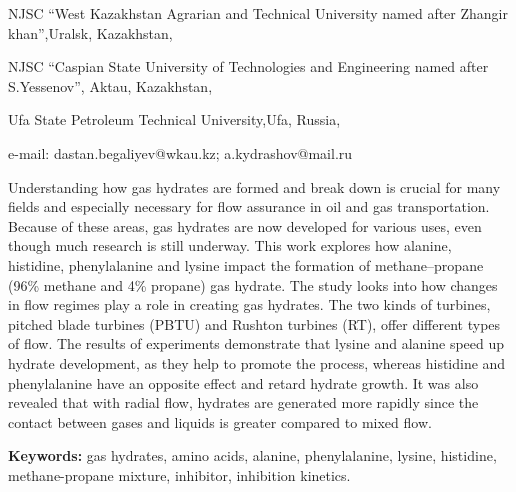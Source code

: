 \begin{affil}
NJSC ``West Kazakhstan Agrarian and Technical University named after Zhangir khan'',Uralsk, Kazakhstan,

NJSC ``Caspian State University of Technologies and Engineering named after S.Yessenov'', Aktau, Kazakhstan,

Ufa State Petroleum Technical University,Ufa, Russia,

e-mail: dastan.begaliyev@wkau.kz; a.kydrashov@mail.ru
\end{affil}

Understanding how gas hydrates are formed and break down is crucial for
many fields and especially necessary for flow assurance in oil and gas
transportation. Because of these areas, gas hydrates are now developed
for various uses, even though much research is still underway. This work
explores how alanine, histidine, phenylalanine and lysine impact the
formation of methane--propane (96\% methane and 4\% propane) gas
hydrate. The study looks into how changes in flow regimes play a role in
creating gas hydrates. The two kinds of turbines, pitched blade turbines
(PBTU) and Rushton turbines (RT), offer different types of flow. The
results of experiments demonstrate that lysine and alanine speed up
hydrate development, as they help to promote the process, whereas
histidine and phenylalanine have an opposite effect and retard hydrate
growth. It was also revealed that with radial flow, hydrates are
generated more rapidly since the contact between gases and liquids is
greater compared to mixed flow.

{\bfseries Keywords:} gas hydrates, amino acids, alanine, phenylalanine,
lysine, histidine, methane-propane mixture, inhibitor, inhibition
kinetics.

